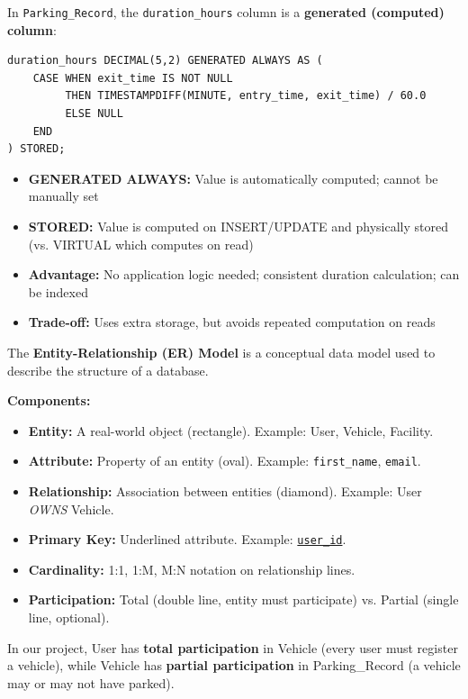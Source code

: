 \documentclass[12pt,a4paper]{article}
\begin{document}
\begin{questionbox}
\end{questionbox}
\begin{answerbox}
In \texttt{Parking\_Record}, the \texttt{duration\_hours} column is a \textbf{generated (computed) column}:

\begin{lstlisting}
duration_hours DECIMAL(5,2) GENERATED ALWAYS AS (
    CASE WHEN exit_time IS NOT NULL
         THEN TIMESTAMPDIFF(MINUTE, entry_time, exit_time) / 60.0
         ELSE NULL
    END
) STORED;
\end{lstlisting}

\begin{itemize}[nosep]
    \item \textbf{GENERATED ALWAYS:} Value is automatically computed; cannot be manually set
    \item \textbf{STORED:} Value is computed on INSERT/UPDATE and physically stored (vs. VIRTUAL which computes on read)
    \item \textbf{Advantage:} No application logic needed; consistent duration calculation; can be indexed
    \item \textbf{Trade-off:} Uses extra storage, but avoids repeated computation on reads
\end{itemize}
\end{answerbox}

\begin{questionbox}
\end{questionbox}
\begin{answerbox}
The \textbf{Entity-Relationship (ER) Model} is a conceptual data model used to describe the structure of a database.

\textbf{Components:}
\begin{itemize}[nosep]
    \item \textbf{Entity:} A real-world object (rectangle). Example: User, Vehicle, Facility.
    \item \textbf{Attribute:} Property of an entity (oval). Example: \texttt{first\_name}, \texttt{email}.
    \item \textbf{Relationship:} Association between entities (diamond). Example: User \textit{OWNS} Vehicle.
    \item \textbf{Primary Key:} Underlined attribute. Example: \underline{\texttt{user\_id}}.
    \item \textbf{Cardinality:} 1:1, 1:M, M:N notation on relationship lines.
    \item \textbf{Participation:} Total (double line, entity must participate) vs. Partial (single line, optional).
\end{itemize}

In our project, User has \textbf{total participation} in Vehicle (every user must register a vehicle), while Vehicle has \textbf{partial participation} in Parking\_Record (a vehicle may or may not have parked).
\end{answerbox}
\end{document}
